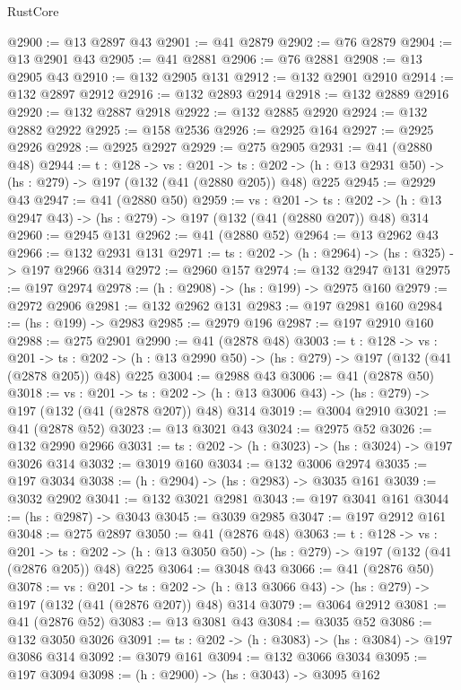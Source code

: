 \begin{lexlean}{RustCore}
\begin{coremodule}
@2900 := @13 @2897 @43
@2901 := @41 @2879
@2902 := @76 @2879
@2904 := @13 @2901 @43
@2905 := @41 @2881
@2906 := @76 @2881
@2908 := @13 @2905 @43
@2910 := @132 @2905 @131
@2912 := @132 @2901 @2910
@2914 := @132 @2897 @2912
@2916 := @132 @2893 @2914
@2918 := @132 @2889 @2916
@2920 := @132 @2887 @2918
@2922 := @132 @2885 @2920
@2924 := @132 @2882 @2922
@2925 := @158 @2536
@2926 := @2925 @164
@2927 := @2925 @2926
@2928 := @2925 @2927
@2929 := @275 @2905
@2931 := @41 (@2880 @48)
@2944 := {t : @128} ->
  {vs : @201} ->
  {ts : @202} -> (h : @13 @2931 @50) -> (hs : @279) -> @197 (@132 (@41 (@2880 @205)) @48) @225
@2945 := @2929 @43
@2947 := @41 (@2880 @50)
@2959 := {vs : @201} ->
  {ts : @202} -> (h : @13 @2947 @43) -> (hs : @279) -> @197 (@132 (@41 (@2880 @207)) @48) @314
@2960 := @2945 @131
@2962 := @41 (@2880 @52)
@2964 := @13 @2962 @43
@2966 := @132 @2931 @131
@2971 := {ts : @202} -> (h : @2964) -> (hs : @325) -> @197 @2966 @314
@2972 := @2960 @157
@2974 := @132 @2947 @131
@2975 := @197 @2974
@2978 := (h : @2908) -> (hs : @199) -> @2975 @160
@2979 := @2972 @2906
@2981 := @132 @2962 @131
@2983 := @197 @2981 @160
@2984 := (hs : @199) -> @2983
@2985 := @2979 @196
@2987 := @197 @2910 @160
@2988 := @275 @2901
@2990 := @41 (@2878 @48)
@3003 := {t : @128} ->
  {vs : @201} ->
  {ts : @202} -> (h : @13 @2990 @50) -> (hs : @279) -> @197 (@132 (@41 (@2878 @205)) @48) @225
@3004 := @2988 @43
@3006 := @41 (@2878 @50)
@3018 := {vs : @201} ->
  {ts : @202} -> (h : @13 @3006 @43) -> (hs : @279) -> @197 (@132 (@41 (@2878 @207)) @48) @314
@3019 := @3004 @2910
@3021 := @41 (@2878 @52)
@3023 := @13 @3021 @43
@3024 := @2975 @52
@3026 := @132 @2990 @2966
@3031 := {ts : @202} -> (h : @3023) -> (hs : @3024) -> @197 @3026 @314
@3032 := @3019 @160
@3034 := @132 @3006 @2974
@3035 := @197 @3034
@3038 := (h : @2904) -> (hs : @2983) -> @3035 @161
@3039 := @3032 @2902
@3041 := @132 @3021 @2981
@3043 := @197 @3041 @161
@3044 := (hs : @2987) -> @3043
@3045 := @3039 @2985
@3047 := @197 @2912 @161
@3048 := @275 @2897
@3050 := @41 (@2876 @48)
@3063 := {t : @128} ->
  {vs : @201} ->
  {ts : @202} -> (h : @13 @3050 @50) -> (hs : @279) -> @197 (@132 (@41 (@2876 @205)) @48) @225
@3064 := @3048 @43
@3066 := @41 (@2876 @50)
@3078 := {vs : @201} ->
  {ts : @202} -> (h : @13 @3066 @43) -> (hs : @279) -> @197 (@132 (@41 (@2876 @207)) @48) @314
@3079 := @3064 @2912
@3081 := @41 (@2876 @52)
@3083 := @13 @3081 @43
@3084 := @3035 @52
@3086 := @132 @3050 @3026
@3091 := {ts : @202} -> (h : @3083) -> (hs : @3084) -> @197 @3086 @314
@3092 := @3079 @161
@3094 := @132 @3066 @3034
@3095 := @197 @3094
@3098 := (h : @2900) -> (hs : @3043) -> @3095 @162

\end{coremodule}
\end{lexlean}
